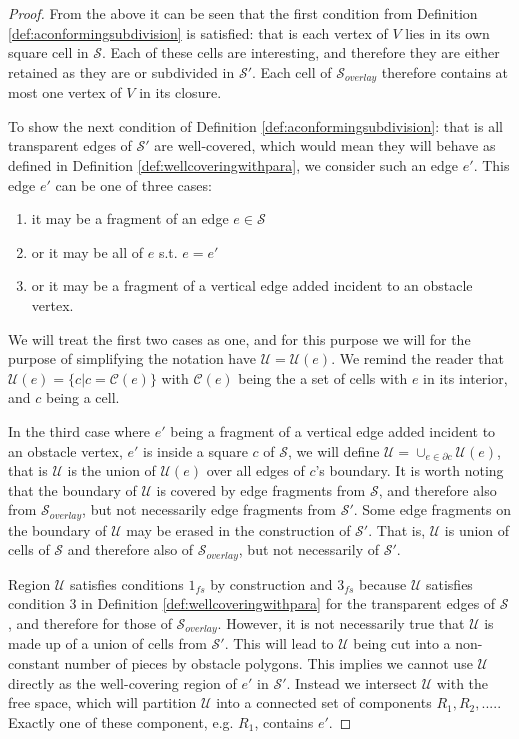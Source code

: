 \begin{proof}
From the above it can be seen that the first condition from Definition \ref{def:aconformingsubdivision} 
is satisfied: that is each vertex of $V$ lies in its own square cell in $\mathcal{S}$. Each of 
these cells are interesting, and therefore they are either retained as they are or subdivided
in $\mathcal{S}'$. Each cell of $\mathcal{S}_{overlay}$ therefore contains at most one vertex 
of $V$ in its closure. 

To show the next condition of Definition \ref{def:aconformingsubdivision}: that is all 
transparent edges of $\mathcal{S}'$ are well-covered, which would mean they will behave as 
defined in Definition \ref{def:wellcoveringwithpara}, we consider such an edge $e'$. This 
edge $e'$ can be one of three cases: 

\begin{enumerate}
\item it may be a fragment of an edge $e\in\mathcal{S}$
\item or it may be all of $e$ s.t. $e=e'$
\item or it may be a fragment of a vertical edge added incident to an obstacle vertex.
\end{enumerate}

We will treat the first two cases as one, and for this purpose we will for the purpose of 
simplifying the notation have $\mathcal{U}=\mathcal{U}(e)$. We remind the reader 
that $\mathcal{U}(e) = \{c|c=\mathcal{C}(e)\}$ with $\mathcal{C}(e)$ being the a set of 
cells with $e$ in its interior, and $c$ being a cell. 

In the third case where $e'$ being a fragment of a vertical edge added incident to an 
obstacle vertex, $e'$ is inside a square $c$ of $\mathcal{S}$, we will define 
$\mathcal{U}=\cup_{e\in \partial c} \mathcal{U}(e)$, that is $\mathcal{U}$ is the union 
of $\mathcal{U}(e)$ over all edges of $c$'s boundary. It is worth noting that the boundary 
of $\mathcal{U}$ is covered by edge fragments from $\mathcal{S}$, and therefore also from
$\mathcal{S}_{overlay}$, but not necessarily edge fragments from $\mathcal{S}'$. Some edge 
fragments on the boundary of $\mathcal{U}$ may be erased in the construction of $\mathcal{S}'$.
That is, $\mathcal{U}$ is union of cells of $\mathcal{S}$ and therefore also of 
$\mathcal{S}_{overlay}$, but not necessarily of $\mathcal{S}'$. 

Region $\mathcal{U}$ satisfies conditions $1_{fs}$ by construction and $3_{fs}$ because 
$\mathcal{U}$ satisfies condition 3 in Definition \ref{def:wellcoveringwithpara} for 
the transparent edges of $\mathcal{S}$, and therefore for those of $\mathcal{S}_{overlay}$. 
However, it is not necessarily true that $\mathcal{U}$ is made up of a union of cells from 
$\mathcal{S}'$. This will lead to $\mathcal{U}$ being cut into a non-constant number of pieces 
by obstacle polygons. This implies we cannot use $\mathcal{U}$ directly as the well-covering 
region of $e'$ in $\mathcal{S}'$. Instead we intersect $\mathcal{U}$ with the free space, which 
will partition $\mathcal{U}$ into a connected set of components $R_1,R_2,....$. Exactly one of 
these component, e.g. $R_1$, contains $e'$. 


\end{proof}
